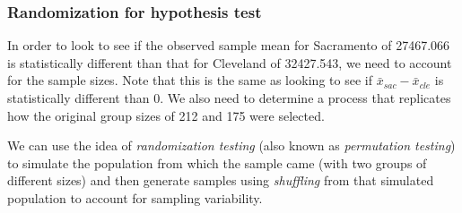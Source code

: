 \documentclass[12pt, krantz2,]{krantz}
\makeatletter
\newenvironment{Shaded}{\begin{snugshade}}{\end{snugshade}}
\newcommand{\DataTypeTok}[1]{\textcolor[rgb]{0.27,0.27,0.27}{#1}}
\newcommand{\DecValTok}[1]{\textcolor[rgb]{0.06,0.06,0.06}{#1}}
\newcommand{\KeywordTok}[1]{\textcolor[rgb]{0.27,0.27,0.27}{\textbf{#1}}}
\newcommand{\NormalTok}[1]{#1}
\newcommand{\OperatorTok}[1]{\textcolor[rgb]{0.43,0.43,0.43}{\textbf{#1}}}
\newcommand{\StringTok}[1]{\textcolor[rgb]{0.5,0.5,0.5}{#1}}
\newenvironment{kframe}{%
\medskip{}
\setlength{\fboxsep}{.8em}
 \def\at@end@of@kframe{}%
 \ifinner\ifhmode%
  \def\at@end@of@kframe{\end{minipage}}%
  \begin{minipage}{\columnwidth}%
 \fi\fi%
 \def\FrameCommand##1{\hskip\@totalleftmargin \hskip-\fboxsep
 \colorbox{shadecolor}{##1}\hskip-\fboxsep
     \hskip-\linewidth \hskip-\@totalleftmargin \hskip\columnwidth}%
 \MakeFramed {\advance\hsize-\width
   \@totalleftmargin\z@ \linewidth\hsize
   \@setminipage}}%
 {\par\unskip\endMakeFramed%
 \at@end@of@kframe}
\renewenvironment{Shaded}{\begin{kframe}}{\end{kframe}}
\makeatother
\begin{document}
\hypertarget{randomization-for-hypothesis-test-1}{%
\subsubsection*{Randomization for hypothesis test}\label{randomization-for-hypothesis-test-1}}


In order to look to see if the observed sample mean for Sacramento of 27467.066 is statistically different than that for Cleveland of 32427.543, we need to account for the sample sizes. Note that this is the same as looking to see if \(\bar{x}_{sac} - \bar{x}_{cle}\) is statistically different than 0. We also need to determine a process that replicates how the original group sizes of 212 and 175 were selected.

We can use the idea of \emph{randomization testing} (also known as \emph{permutation testing}) to simulate the population from which the sample came (with two groups of different sizes) and then generate samples using \emph{shuffling} from that simulated population to account for sampling variability.

\begin{Shaded}
\end{Shaded}

\begin{Shaded}
\end{Shaded}
\end{document}
